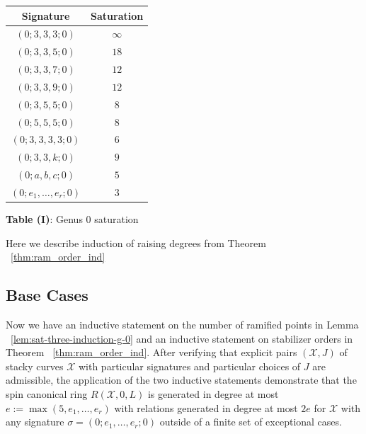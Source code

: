 \documentclass{amsart}
\theoremstyle{plain}
\theoremstyle{definition}
\theoremstyle{remark}
\numberwithin{equation}{section}
\newcommand\ssec{\subsection}
\newcommand \sx{\mathscr X}
\begin{document}
\begin{longtable}
	{| c | c |}
	\hline
	Signature & Saturation \\
	\hline
	\hline

	$(0; 3, 3, 3; 0)$ & $\infty$ \\	\hline

	$(0; 3, 3, 5; 0)$ & $18$ \\	\hline
	
	$(0; 3, 3, 7; 0)$ & $12$ \\	\hline
	
	$(0; 3, 3, 9; 0)$ & $12$ \\	\hline
	
	$(0; 3, 5, 5; 0)$ & $8$ \\	\hline
	
	$(0; 5, 5, 5; 0)$ & $8$ \\	\hline
	
	$(0; 3, 3, 3, 3; 0)$ & $6$ \\	\hline
	
	\hline
	\hline
	
	$(0; 3, 3, k; 0)$ & $9$ \\	\hline
	
	$(0; a, b, c; 0)$ & $5$ \\	\hline
	
	$(0; e_1, \ldots, e_r; 0)$ & $3$ \\	\hline
\end{longtable}

\begin{center}
\textbf{Table (I)}: Genus 0 saturation
\end{center}

Here we describe induction of raising degrees from Theorem ~\ref{thm:ram_order_ind}

\ssec{Base Cases}
\label{ssec:g_0_base}
Now we have an inductive statement on the number of ramified
points in Lemma ~\ref{lem:sat-three-induction-g-0} and
an inductive statement on stabilizer orders in Theorem
~\ref{thm:ram_order_ind}. After verifying that explicit pairs
$(\sx, J)$ of stacky curves $\sx$ with particular signatures and
particular choices of $J$ are admissible, the application of the
two inductive statements demonstrate that the spin canonical ring
$R(\sx , 0, L)$ is generated in degree at most $e := \max(5, e_1,
\ldots, e_r)$ with relations generated in degree at most $2e$ for
$\sx$ with any signature $\sigma = (0; e_1, \ldots , e_r; 0)$ outside
of a finite set of exceptional cases.
\end{document}
